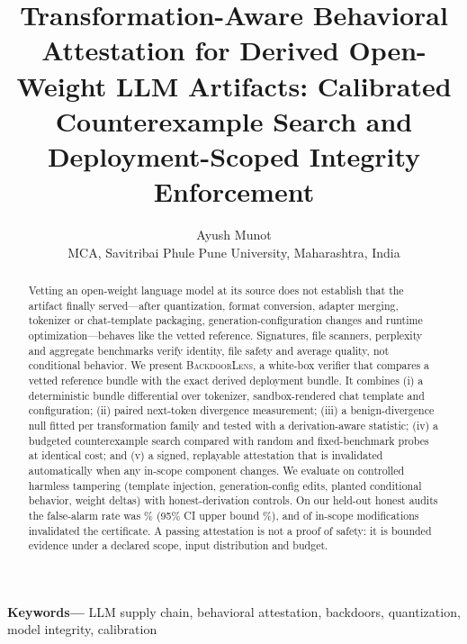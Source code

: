 \IfFileExists{IEEEtran.cls}{\documentclass[conference]{IEEEtran}\newcommand{\hasieee}{1}}{\documentclass[10pt,twocolumn]{article}\newcommand{\hasieee}{0}}
\newenvironment{IEEEkeywords}{\par\noindent\textbf{Keywords---}}{\par}
\newcommand{\IEEEauthorblockN}[1]{#1}\newcommand{\IEEEauthorblockA}[1]{\\\small #1}
\newcommand{\bl}{\textsc{BackdoorLens}}
\begin{document}
\title{Transformation-Aware Behavioral Attestation for Derived Open-Weight LLM Artifacts: Calibrated Counterexample Search and Deployment-Scoped Integrity Enforcement}
\author{\IEEEauthorblockN{Ayush Munot}\IEEEauthorblockA{MCA, Savitribai Phule Pune University, Maharashtra, India}}
\maketitle
\ifnum{}
\begin{center}\end{center}
\fi
\begin{abstract}
Vetting an open-weight language model at its source does not establish that the artifact finally served---after quantization, format conversion, adapter merging, tokenizer or chat-template packaging, generation-configuration changes and runtime optimization---behaves like the vetted reference. Signatures, file scanners, perplexity and aggregate benchmarks verify identity, file safety and average quality, not conditional behavior. We present \bl{}, a white-box verifier that compares a vetted reference bundle with the exact derived deployment bundle. It combines (i) a deterministic bundle differential over tokenizer, sandbox-rendered chat template and configuration; (ii) paired next-token divergence measurement; (iii) a benign-divergence null fitted per transformation family and tested with a derivation-aware statistic; (iv) a budgeted counterexample search compared with random and fixed-benchmark probes at identical cost; and (v) a signed, replayable attestation that is invalidated automatically when any in-scope component changes. We evaluate on controlled harmless tampering (template injection, generation-config edits, planted conditional behavior, weight deltas) with honest-derivation controls. On our \nHonestAudits{} held-out honest audits the false-alarm rate was \fprGuided\% (95\% CI upper bound \fprGuidedHi\%), and \invTP{} of \invN{} in-scope modifications invalidated the certificate. A passing attestation is not a proof of safety: it is bounded evidence under a declared scope, input distribution and budget.
\end{abstract}
\begin{IEEEkeywords}
LLM supply chain, behavioral attestation, backdoors, quantization, model integrity, calibration
\end{IEEEkeywords}
\end{document}
